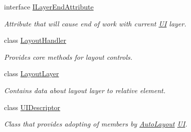 \begin{DoxyCompactItemize}
interface \mbox{\hyperlink{interface_wpf_handler_1_1_u_i_1_1_auto_layout_1_1_i_layer_end_attribute}{I\+Layer\+End\+Attribute}}
\begin{DoxyCompactList}\small\item\em Attribute that will cause end of work with current \mbox{\hyperlink{namespace_wpf_handler_1_1_u_i}{UI}} layer. \end{DoxyCompactList}\item 
class \mbox{\hyperlink{class_wpf_handler_1_1_u_i_1_1_auto_layout_1_1_layout_handler}{Layout\+Handler}}
\begin{DoxyCompactList}\small\item\em Provides core methods for layout controls. \end{DoxyCompactList}\item 
class \mbox{\hyperlink{class_wpf_handler_1_1_u_i_1_1_auto_layout_1_1_layout_layer}{Layout\+Layer}}
\begin{DoxyCompactList}\small\item\em Contains data about layout layer to relative element. \end{DoxyCompactList}\item 
class \mbox{\hyperlink{class_wpf_handler_1_1_u_i_1_1_auto_layout_1_1_u_i_descriptor}{U\+I\+Descriptor}}
\begin{DoxyCompactList}\small\item\em Class that provides adopting of members by \mbox{\hyperlink{namespace_wpf_handler_1_1_u_i_1_1_auto_layout}{Auto\+Layout}} \mbox{\hyperlink{namespace_wpf_handler_1_1_u_i}{UI}}. \end{DoxyCompactList}\end{DoxyCompactItemize}
